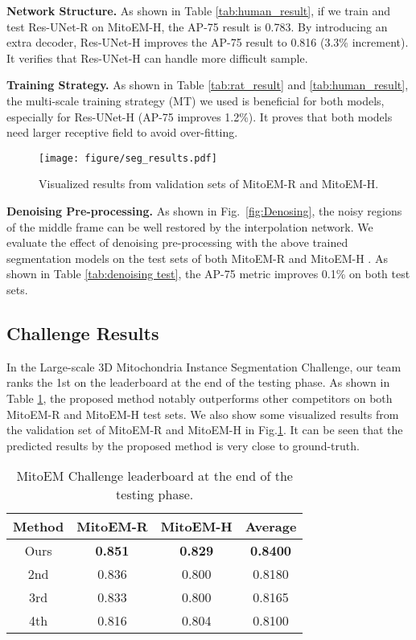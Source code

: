\documentclass{article}
\begin{document}
\textbf{Network Structure.} As shown in Table \ref{tab:human_result}, if we train and test Res-UNet-R on MitoEM-H, the AP-75 result is 0.783. By introducing an extra decoder, Res-UNet-H improves the AP-75 result to 0.816 (3.3\% increment). It verifies that Res-UNet-H can handle more difficult sample.

\textbf{Training Strategy.} As shown in Table \ref{tab:rat_result} and \ref{tab:human_result}, the multi-scale training strategy (MT) we used is beneficial for both models, especially for Res-UNet-H (AP-75 improves 1.2\%). It proves that both models need larger receptive field to avoid over-fitting.


 \begin{figure}[!t]
	\centering
	\texttt{[image: figure/seg\_results.pdf]}
	\caption{Visualized results from validation sets of MitoEM-R and MitoEM-H.} \label{fig:seg_results}
	\vspace{-0.3cm}
\end{figure}
\textbf{Denoising Pre-processing.} As shown in Fig.~\ref{fig:Denosing}, the noisy regions of the middle frame can be well restored by the interpolation network. We evaluate the effect of denoising pre-processing with the above trained segmentation models on the test sets of both MitoEM-R and MitoEM-H . As shown in Table \ref{tab:denoising test}, the AP-75 metric improves 0.1\% on both test sets. 

\vspace{-0.2cm}
\subsection{Challenge Results}
In the Large-scale 3D Mitochondria Instance Segmentation Challenge, our team ranks the 1st on the leaderboard at the end of the testing phase. As shown in Table \ref{tab:final_rank}, the proposed method notably outperforms other competitors on both MitoEM-R and MitoEM-H  test sets.   We also show some visualized results from the validation set of MitoEM-R and MitoEM-H in Fig.\ref{fig:seg_results}. It can be seen that the predicted results by the proposed method is very close to ground-truth.

\vspace{-0.3cm}



\begin{table}[t]
\centering
\setlength{\tabcolsep}{2mm}
\begin{tabular}{c|c|c|c}
	\hline
	Method     & MitoEM-R   & MitoEM-H   & Average        \\ \hline
	Ours       & \textbf{0.851}   & \textbf{0.829 }  &  \textbf{0.8400}  \\
	2nd    & 0.836   & 0.800   &  0.8180  \\
	3rd  & 0.833   & 0.800   &  0.8165 \\
	4th & 0.816   & 0.804   &  0.8100 \\
	\hline
\end{tabular}
\caption{MitoEM Challenge leaderboard at the end of the testing phase.}
	\vspace{-0.3cm}
\label{tab:final_rank}
\end{table}
\end{document}

